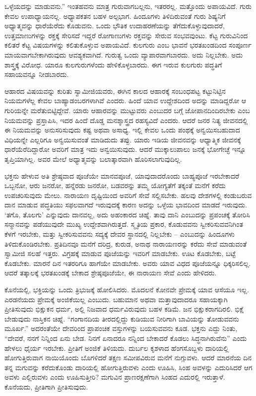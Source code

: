 ಒಳ್ಳೆಯದನ್ನು ಮಾಡುವನು.” ಇಂತಹವನು ಮಾತ್ರ ಗುರುವಾಗಬಲ್ಲನು, ಇತರರಲ್ಲ. ಮತ್ತೊಂದು ಅಪಾಯವಿದೆ. ಗುರು ಕೇವಲ ಉಪಾಧ್ಯಾಯನಲ್ಲ. ಅಧ್ಯಾಪಕತನ ಬಹಳ ಅಲ್ಪಭಾಗ. ಹಿಂದೂಗಳು ತಿಳಿದಿರುವಂತೆ ಗುರು ಶಿಷ್ಯನಿಗೆ ಅಧ್ಯಾತ್ಮವನ್ನು ಧಾರೆಯೆರೆದು ಕೊಡುವನು. ಒಂದು ಭೌತಿಕ ಉದಾಹರಣೆಯನ್ನು ತೆಗೆದುಕೊಳ್ಳುವುದಾದರೆ, ಉತ್ತಮಾಣುಗಳನ್ನು ರಕ್ತಕ್ಕೆ ಸೇರಿಸದೆ ಇದ್ದರೆ ರೋಗಾಣುಗಳು ರಕ್ತವನ್ನು ಸೇರುವ ಸಂಭವವುಂಟು. ಕೆಟ್ಟ ಗುರುವಿನಿಂದ ಕಲಿತರೆ ಕೆಟ್ಟ ವಿಷಯಗಳನ್ನು ಕಲಿತುಕೊಳ್ಳುವ ಅಪಾಯವಿದೆ. ಕುಲಗುರು ಎಂಬ ಭಾವನೆ ಭರತಖಂಡದಿಂದ ಸಂಪೂರ್ಣ ಮಾಯವಾಗಬೇಕಾಗಿರುವುದು ಆವಶ್ಯಕವಾಗಿದೆ. ಗುರುತ್ವ ಒಂದು ವ್ಯಾಪಾರವಾಗಬಾರದು. ಅದು ನಿಲ್ಲಬೇಕು. ಅದು ಶಾಸ್ತ್ರಕ್ಕೆ ವಿರೋಧ. ಯಾರೂ ಕುಲಗುರುಗಳೆಂದು ಹೇಳಿಕೊಳ್ಳಬಾರದು. ಈಗ ಇರುವ ಕುಲಗುರು ಪದ್ಧತಿಗೆ ಸಹಾಯವನ್ನೂ ನೀಡಬಾರದು.

ಆಹಾರದ ವಿಷಯವನ್ನು ಕುರಿತು ಸ್ವಾಮೀಜಿಯವರು, ಈಗಿನ ಕಾಲದ ಆಹಾರಕ್ಕೆ ಸಂಬಂಧಪಟ್ಟ ಕಟ್ಟುನಿಟ್ಟಿನ ನಿಯಮಗಳೆಲ್ಲ ಕೇವಲ ಬಾಹ್ಯಾಡಂಬರಗಳಾಗಿವೆ ಎಂದರು. ಹಿಂದೆ ಯಾವ ಉದ್ದೇಶದಿಂದ ಅದನ್ನು ಮಾಡಿದ್ದರೋ ಆ ಗುರಿಯನ್ನೇ ಮರೆತುಬಿಟ್ಟಿದ್ದೇವೆ. ಯಾರು ಆಹಾರವನ್ನು ಮುಟ್ಟುವರು ಎಂಬುದರ ಬಗ್ಗೆ ಜೋಪಾನದಿಂದಿರಬೇಕು ಎಂಬ ನಿಯಮವನ್ನು ಪ್ರಸ್ತಾಪಿಸಿ, ಇದರ ಹಿಂದೆ ದೊಡ್ಡ ಮನಶ್ಶಾಸ್ತ್ರದ ರಹಸ್ಯವಿದೆ ಎಂದರು. ಆದರೆ ಜನರ ನಿತ್ಯ ಜೀವನದಲ್ಲಿ ಈ ನಿಯಮವನ್ನು ಅನುಸರಿಸುವುದು ಕಷ್ಟ ಅಥವಾ ಅಸಾಧ್ಯ. ಇಲ್ಲಿ ಕೇವಲ ಒಂದು ಪಂಥಕ್ಕೆ ಅನ್ವಯಿಸಬಹುದಾದ ವಿಧಿಯನ್ನೇ ಎಲ್ಲರಿಗೂ ಅನ್ವಯಿಸುವಂತೆ ಮಾಡಿದುದು ತಪ್ಪು. ಯಾರು ಇಡಿಯ ಜೀವನವನ್ನು ಆಧ್ಯಾತ್ಮಿಕ ಜೀವನಕ್ಕೆ ಧಾರೆಯೆರೆದಿದ್ದಾರೋ ಅವರಿಗೆ ಮಾತ್ರ ಇದು ಅನ್ವಯಿಸುವುದು. ಆದರೆ ಮುಕ್ಕಾಲುಪಾಲು ಜನಕ್ಕೆ ಭೋಗೇಚ್ಛೆ ಇನ್ನೂ ತೃಪ್ತಿಯಾಗಿಲ್ಲ. ಅವರ ಮೇಲೆ ಅಧ್ಯಾತ್ಮವನ್ನು ಬಲಾತ್ಕಾರವಾಗಿ ಹೊರಿಸಲಾಗುವುದಿಲ್ಲ.

ಭಕ್ತನು ಹೇಳುವ ಅತಿ ಶ್ರೇಷ್ಠವಾದ ಪೂಜೆಯೇ ಮಾನವಪೂಜೆ, ಯಾವುದಾದರೊಂದು ಬಾಹ್ಯಪೂಜೆ ಇರಬೇಕಾದರೆ ಒಬ್ಬನೋ, ಆರು ಜನರೋ, ಹನ್ನೆರಡು ಜನರೋ, ಬಡವರನ್ನು ತಮ್ಮ ಯೋಗ್ಯತೆಗೆ ತಕ್ಕಂತೆ ಮನೆಗೆ ಕರೆದು ಉಪಚರಿಸುವುದು ಮೇಲು. ನಾರಾಯಣ ದೃಷ್ಟಿಯಿಂದ ಅವರಿಗೆ ಸೇವೆ ಸಲ್ಲಿಸಬೇಕು. ಹಲವು ದೇಶಗಳಲ್ಲಿ ಕಂಡುಬರುವ ದಾನ ಮಾಡುವ ಪದ್ಧತಿಯು ಸಫಲವಾಗದೆ ಇರುವುದಕ್ಕೆ ಕಾರಣ ಅದನ್ನು ಒಳ್ಳೆಯ ಭಾವದಿಂದ ಮಾಡದೆ ಇರುವುದು. ‘ತಗೊ, ತೊಲಗು’ ಎನ್ನುವುದು ದಾನವಲ್ಲ, ಅದು ಅಹಂಕಾರದ ಚಿಹ್ನೆ. ತಾವು ದಾನಿ ಎಂಬುದನ್ನು ಪ್ರಪಂಚಕ್ಕೆ ತೋರಿಸಿ ಸನ್ಮಾನವನ್ನು ಪಡೆಯುವುದೇ ಮುಖ್ಯ ಉದ್ದೇಶವಾಗಿರುತ್ತದೆ. ಸ್ಮೃತಿಯ ಪ್ರಕಾರ, ಕೊಡುವವನು ಸ್ವೀಕರಿಸುವವನಿಗಿಂತ ಕೆಳಗೆ ಇರಬೇಕು, ಮತ್ತು ಸ್ವೀಕರಿಸುವವನು ಸದ್ಯಕ್ಕೆ ದೇವರ ಸ್ಥಾನದಲ್ಲಿ ನಿಲ್ಲಬೇಕು – ಎಂಬುದನ್ನು ಹಿಂದೂಗಳು ತಿಳಿದುಕೊಂಡಿರಬೇಕು. ಪ್ರತಿದಿನವೂ ಮನೆಗೆ ದರಿದ್ರ, ಕುರುಡ, ಅನಾಥ ನಾರಾಯಣರನ್ನು ಕರೆದು ಸೇವೆ ಮಾಡುವಂತೆ ಸ್ವಾಮೀಜಿ ಸಲಹೆ ಇತ್ತರು. ವಿಗ್ರಹಕ್ಕೆ ಮಾಡುವ ಪೂಜೆಯನ್ನು ಇವರಿಗೆ ಮಾಡಬೇಕು. ಊಟ ಕೊಡಬೇಕು, ಬಟ್ಟೆ ಕೊಡಬೇಕು. ಮಾರನೆ ದಿನ ಇತರರಿಗೂ ಹಾಗೆಯೇ ಮಾಡಬೇಕು. ಅವರು ಯಾವ ವಿಧದ ಪೂಜೆಯನ್ನೂ ಧಿಕ್ಕರಿಸಲಿಲ್ಲ. ಆದರೆ ತತ್ಕಾಲಕ್ಕೆ ಭರತಖಂಡಕ್ಕೆ ಬೇಕಾದ ಶ್ರೇಷ್ಠಪೂಜೆಯೇ, ಈ ನಾರಾಯಣ ಸೇವೆ ಎಂದು ಹೇಳಿದರು.

ಕೊನೆಯಲ್ಲಿ, ಭಕ್ತಿಯನ್ನು ಒಂದು ತ್ರಿಭುಜಕ್ಕೆ ಹೋಲಿಸಿದರು. ಮೊದಲನೆ ಕೋನವೇ ಪ್ರೇಮಕ್ಕೆ ಯಾವ ಆಸೆಯೂ ಇಲ್ಲ. ಎರಡನೆಯದು ಪ್ರೇಮಕ್ಕೆ ಅಂಜಿಕೆಯಿಲ್ಲ ಎಂಬುದು. ಬಹುಮಾನ ಅಥವಾ ಮತ್ತಾವುದಾದರೂ ಸಹಾಯಕ್ಕಾಗಿ ಪ್ರೀತಿಸುವುದು ಭಿಕ್ಷುಕನ ಧರ್ಮ, ಅಲ್ಲಿ ನಿಜವಾದ ಧರ್ಮವಿರುವುದು ಬಹಳ ಕಡಿಮೆ. ಜನ ಭಿಕ್ಷುಕರಾಗದಿರಲಿ. ಭಿಕ್ಷೆ ಬೇಡುವುದು ನಾಸ್ತಿಕನ ಚಿಹ್ನೆ. “ಗಂಗಾನದಿಯ ತೀರದಲ್ಲಿದ್ದು ಕುಡಿಯುವ ನೀರಿಗಾಗಿ ಬಾವಿಯನ್ನು ತೋಡುವವನು ಮೂರ್ಖ.” ಅದರಂತೆಯೇ ದೇವರಿಂದ ಪ್ರಾಪಂಚಿಕ ವಸ್ತುಗಳನ್ನು ಬಯಸುವವನು ಕೂಡ. ಭಕ್ತನು ಎದ್ದು ನಿಂತು, “ದೇವರೆ, ನನಗೆ ನಿನ್ನಿಂದ ಏನು ಬೇಡ. ನಿನಗೆ ಏನಾದರೂ ನನ್ನಿಂದ ಬೇಕಾದರೆ ಕೊಡಲು ಸಿದ್ಧನಾಗಿರುವೆನು” ಎಂದು ಹೇಳಲು ಧೈರ್ಯ ಇರಬೇಕು. ಪ್ರೀತಿಗೆ ಅಂಜಿಕೆ ತಿಳಿಯದು. ದುರ್ಬಲ ಕೃಶಳಾದ ಹೆಂಗಸೊಬ್ಬಳು ದಾರಿಯಲ್ಲಿ ಹೋಗುತ್ತಿರುವಾಗ ನಾಯಿಯೊಂದು ಬೊಗಳಿದರೆ ತಕ್ಷಣ ಸಮೀಪವಿರುವ ಮನೆಗೆ ನುಗ್ಗುವಳು. ಆದರೆ ಮಾರನೆಯ ದಿನ ತನ್ನ ಮಗುವನ್ನು ಕರೆದುಕೊಂಡು ದಾರಿಯಲ್ಲಿ ಹೋಗುತ್ತಿರುವಳು ಎಂದು ಊಹಿಸಿ, ಸಿಂಹ ಅವಳನ್ನು ಎದುರಿಸಿದರೆ ಆಗ ಅವಳು ಎಲ್ಲಿರುವಳು ಎಂದು ಊಹಿಸುತ್ತೀರಿ? ಮಗುವಿನ ಪ್ರಾಣರಕ್ಷಣೆಗಾಗಿ ಸಿಂಹದ ಎದುರಲ್ಲಿ ಇರುತ್ತಾಳೆ. ಕೊನೆಯದು, ಪ್ರೀತಿಗಾಗಿ ಪ್ರೀತಿಸುವುದು.

